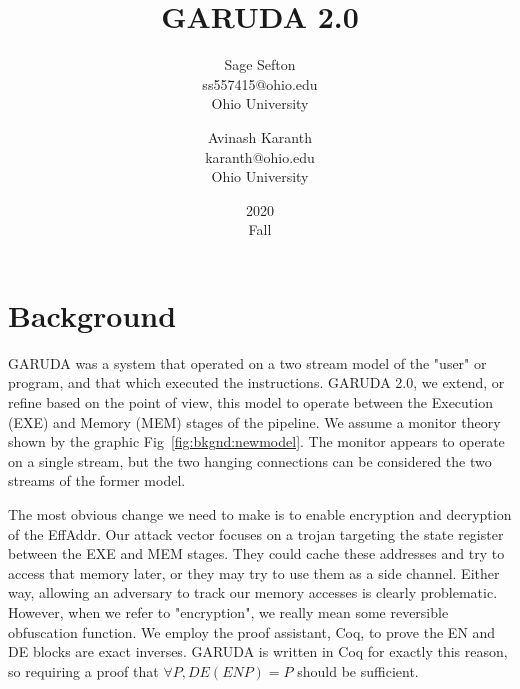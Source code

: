 \documentclass[12pt, letterpaper]{article}
\def \sysname {\textsc{GARUDA 2.0}\xspace}
\def \oldname {\textsc{GARUDA}\xspace}
\begin{document}
  \title{\sysname}
  \date{2020\\ Fall}

  \author{
    Sage Sefton \\
    ss557415@ohio.edu \\
    Ohio University \\
    \and
    Avinash Karanth  \\
    karanth@ohio.edu \\
    Ohio University  \\
  }

  \maketitle
  \cleardoublepage

  \section{Background}\label{sec:bkgnd}

    \oldname was a system that operated on a two stream model of the "user" or program, and that which executed the instructions.
    \sysname, we extend, or refine based on the point of view, this model to operate between the Execution (EXE) and Memory (MEM) stages of the pipeline.
    We assume a monitor theory shown by the graphic Fig~\ref{fig:bkgnd:newmodel}.
    The monitor appears to operate on a single stream, but the two hanging connections can be considered the two streams of the former model.

    The most obvious change we need to make is to enable encryption and decryption of the EffAddr.
    Our attack vector focuses on a trojan targeting the state register between the EXE and MEM stages.
    They could cache these addresses and try to access that memory later, or they may try to use them as a side channel.
    Either way, allowing an adversary to track our memory accesses is clearly problematic.
    However, when we refer to "encryption", we really mean some reversible obfuscation function.
    We employ the proof assistant, Coq, to prove the EN and DE blocks are exact inverses.
    \oldname is written in Coq for exactly this reason, so requiring a proof that $\forall P, DE (EN P) = P$ should be sufficient.
\end{document}
